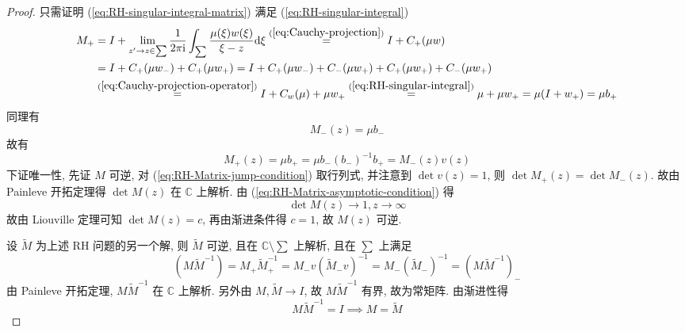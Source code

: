 \begin{proof}
  只需证明 (\ref{eq:RH-singular-integral-matrix}) 满足 (\ref{eq:RH-singular-integral})
  \begin{equation}
    \begin{aligned}
    M_{+} &= I + \lim_{z' \to z \in \sum} \frac{1}{2 \pi \mathrm{i} }\int_{\sum} \frac{\mu(\xi) w(\xi)}{\xi - z} \mathrm{d} \xi \overset{(\ref{eq:Cauchy-projection})}{=} I + C_{+}(\mu w) \\
          &= I + C_{+}(\mu w_{-}) + C_{+}(\mu w_{+}) = I + C_{+}(\mu w_{-}) + C_{-}(\mu w_{+}) +   C_{+}(\mu w_{+}) + C_{-}(\mu w_{+}) \\
          &\overset{(\ref{eq:Cauchy-projection-operator})}{=} I + C_{w}(\mu) + \mu w_{+} \overset{(\ref{eq:RH-singular-integral})}{=} \mu + \mu w_{+} = \mu (I + w_{+}) = \mu b_{+}
    \end{aligned}
  \end{equation}
同理有
\begin{equation}
  M_{-}(z) = \mu b_{-}
\end{equation}
故有
\begin{equation}
  M_{+}(z) = \mu b_{+} = \mu b_{-}(b_{-})^{-1} b_{+} = M_{-}(z)v(z)
\end{equation}
下证唯一性, 先证 $ M $ 可逆, 对 (\ref{eq:RH-Matrix-jump-condition}) 取行列式, 并注意到 $ \det v(z) = 1 $, 则 $ \det M_{+}(z) = \det M_{-}(z) $. 故由 Painleve 开拓定理得 $ \det M(z) $ 在 $ \mathbb{C} $ 上解析. 由 (\ref{eq:RH-Matrix-asymptotic-condition}) 得
\begin{equation}
  \det M(z) \to 1, z \to \infty
\end{equation}
故由 Liouville 定理可知 $ \det M(z) = c $, 再由渐进条件得 $ c = 1 $, 故 $ M(z) $ 可逆.

设 $ \widetilde{M} $ 为上述 RH 问题的另一个解, 则 $ \widetilde{M} $ 可逆, 且在 $ \mathbb{C} \setminus  \sum $ 上解析, 且在 $ \sum $ 上满足 
\begin{equation}
  (M \widetilde{M}^{-1}) = M_{+} \widetilde{M}_{+}^{-1} = M_{-} v (\widetilde{M}_{-} v)^{-1} = M_{-}(\widetilde{M}_{-})^{-1} = (M \widetilde{M}^{-1})_{-}
\end{equation}
由 Painleve 开拓定理, $ M \widetilde{M}^{-1} $ 在 $ \mathbb{C} $ 上解析. 另外由 $ M, \widetilde{M} \to I $, 故 $ M \widetilde{M}^{-1} $ 有界, 故为常矩阵. 由渐进性得 
\begin{equation}
  M \widetilde{M}^{-1} = I \implies M = \widetilde{M}
\end{equation} 
\end{proof}

